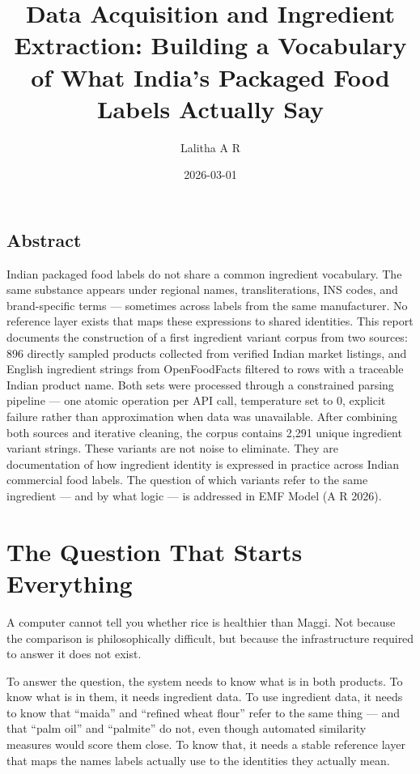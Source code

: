 \documentclass[
  letterpaper,
  DIV=11,
  numbers=noendperiod]{scrartcl}
\title{Data Acquisition and Ingredient Extraction: Building a Vocabulary
of What India's Packaged Food Labels Actually Say}
\author{Lalitha A R}
\date{2026-03-01}
\renewcommand*\contentsname{Table of contents}
\newcommand\contentsname{Table of contents}
\begin{document}
\maketitle

\renewcommand*\contentsname{Table of contents}
{
\setcounter{tocdepth}{3}
\tableofcontents
}

\subsection*{Abstract}\label{abstract}

Indian packaged food labels do not share a common ingredient vocabulary.
The same substance appears under regional names, transliterations, INS
codes, and brand-specific terms --- sometimes across labels from the
same manufacturer. No reference layer exists that maps these expressions
to shared identities. This report documents the construction of a first
ingredient variant corpus from two sources: 896 directly sampled
products collected from verified Indian market listings, and English
ingredient strings from OpenFoodFacts filtered to rows with a traceable
Indian product name. Both sets were processed through a constrained
parsing pipeline --- one atomic operation per API call, temperature set
to 0, explicit failure rather than approximation when data was
unavailable. After combining both sources and iterative cleaning, the
corpus contains 2,291 unique ingredient variant strings. These variants
are not noise to eliminate. They are documentation of how ingredient
identity is expressed in practice across Indian commercial food labels.
The question of which variants refer to the same ingredient --- and by
what logic --- is addressed in EMF Model (A R 2026).

\section{The Question That Starts
Everything}\label{the-question-that-starts-everything}

A computer cannot tell you whether rice is healthier than Maggi. Not
because the comparison is philosophically difficult, but because the
infrastructure required to answer it does not exist.

To answer the question, the system needs to know what is in both
products. To know what is in them, it needs ingredient data. To use
ingredient data, it needs to know that ``maida'' and ``refined wheat
flour'' refer to the same thing --- and that ``palm oil'' and
``palmite'' do not, even though automated similarity measures would
score them close. To know that, it needs a stable reference layer that
maps the names labels actually use to the identities they actually mean.
\end{document}
